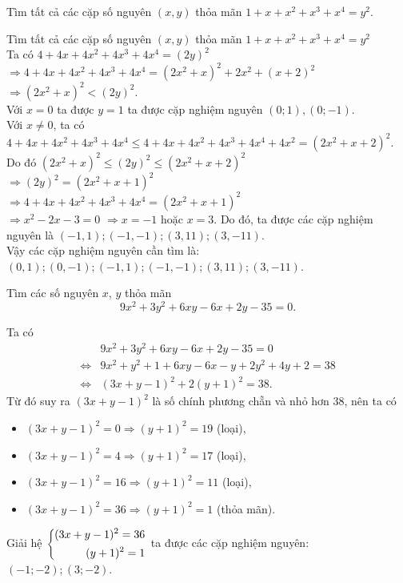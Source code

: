 \begin{bt}%
\hfill
Tìm tất cả các cặp số nguyên $(x,y)$ thỏa mãn $1+x+x^2+x^3+x^4=y^2$.


\loigiai
{
	Tìm tất cả các cặp số nguyên $(x,y)$ thỏa mãn $1+x+x^2+x^3+x^4=y^2$\\
	Ta có $4+4x+4x^2+4x^3+4x^4=(2y)^2$
	$\Rightarrow 4+4x+4x^2+4x^3+4x^4=(2x^2+x)^2+2x^2+(x+2)^2$ \\
	$\Rightarrow (2x^2+x)^2<(2y)^2$.\\
	Với $x=0$ ta được $y=1$ ta được cặp nghiệm nguyên $(0;1), (0;-1)$.\\
	Với $x \ne 0$, ta có $4+4x+4x^2+4x^3+4x^4 \leq 4+4x+4x^2+4x^3+4x^4 +4x^2=(2x^2+x+2)^2$.\\
	Do đó $(2x^2+x)^2 \leq (2y)^2 \leq (2x^2+x+2)^2$\\
	$\Rightarrow (2y)^2=(2x^2+x+1)^2$\\
	$\Rightarrow 4+4x+4x^2+4x^3+4x^4=(2x^2+x+1)^2$ \\
	$\Rightarrow x^2-2x-3=0$ $\Rightarrow x=-1$ hoặc $x=3$.
	Do đó, ta được các cặp nghiệm nguyên là $(-1,1); (-1,-1); (3,11); (3,-11)$.\\
	Vậy các cặp nghiệm nguyên cần tìm là: $(0,1); (0,-1); (-1,1); (-1,-1); (3,11); (3,-11)$.\\
	
}
\end{bt}
\begin{bt}%
Tìm các số nguyên $x$, $y$ thỏa mãn 
$$9x^2+3y^2+6xy-6x+2y-35=0.$$
\loigiai
{Ta có 
	{\allowdisplaybreaks
	\begin{align*}
	&9x^2+3y^2+6xy-6x+2y-35=0\\
	\Leftrightarrow& 9x^2+y^2+1+6xy-6x-y+2y^2+4y+2=38\\
	\Leftrightarrow&(3x+y-1)^2+2(y+1)^2=38.
	\end{align*}}Từ đó suy ra $(3x+y-1)^2$ là số chính phương chẵn và nhỏ hơn $38$, nên ta có
	\begin{itemize}
		\item $(3x+y-1)^2=0\Rightarrow (y+1)^2=19$ (loại),
		\item $(3x+y-1)^2=4\Rightarrow (y+1)^2=17$ (loại),
		\item $(3x+y-1)^2=16\Rightarrow (y+1)^2=11$ (loại),
		\item $(3x+y-1)^2=36\Rightarrow (y+1)^2=1$ (thỏa mãn).
	\end{itemize} 
	Giải hệ $\left\{\begin{aligned}(3x+y-1)^2=36\\ (y+1)^2=1\end{aligned}\right.$ ta được các cặp nghiệm nguyên: $(-1;-2); (3;-2)$.
	
}
\end{bt}

